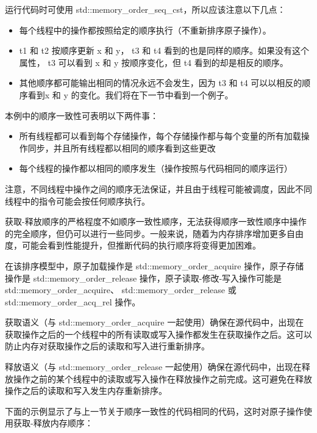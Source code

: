 运行代码时可使用 std::memory\_order\_seq\_cst，所以应该注意以下几点：

\begin{itemize}
\item
每个线程中的操作都按照给定的顺序执行（不重新排序原子操作）。

\item
t1 和 t2 按顺序更新 x 和 y， t3 和 t4 看到的也是同样的顺序。如果没有这个属性， t3 可以看到 x 和 y 按顺序变化，但 t4 看到的却是相反的顺序。

\item
其他顺序都可能输出相同的情况永远不会发生，因为 t3 和 t4 可以以相反的顺序看到x 和 y 的变化。我们将在下一节中看到一个例子。
\end{itemize}

本例中的顺序一致性可表明以下两件事：

\begin{itemize}
\item
所有线程都可以看到每个存储操作，每个存储操作都与每个变量的所有加载操作同步，并且所有线程都以相同的顺序看到这些更改

\item
每个线程的操作都以相同的顺序发生（操作按照与代码相同的顺序运行）
\end{itemize}

注意，不同线程中操作之间的顺序无法保证，并且由于线程可能被调度，因此不同线程中的指令可能会按任何顺序执行。


获取-释放顺序的严格程度不如顺序一致性顺序，无法获得顺序一致性顺序中操作的完全顺序，但仍可以进行一些同步。一般来说，随着为内存排序增加更多自由度，可能会看到性能提升，但推断代码的执行顺序将变得更加困难。

在该排序模型中，原子加载操作是 std::memory\_order\_acquire 操作，原子存储操作是 std::memory\_order\_release 操作，原子读取-修改-写入操作可能是 std::memory\_order\_acquire、 std::memory\_order\_release 或 std::memory\_order\_acq\_rel 操作。

获取语义（与 std::memory\_order\_acquire 一起使用）确保在源代码中，出现在获取操作之后的一个线程中的所有读取或写入操作都发生在获取操作之后。这可以防止内存对获取操作之后的读取和写入进行重新排序。

释放语义（与 std::memory\_order\_release 一起使用）确保在源代码中，出现在释放操作之前的某个线程中的读取或写入操作在释放操作之前完成。这可避免在释放操作之后的读取和写入发生内存重新排序。

下面的示例显示了与上一节关于顺序一致性的代码相同的代码，这时对原子操作使用获取-释放内存顺序：

